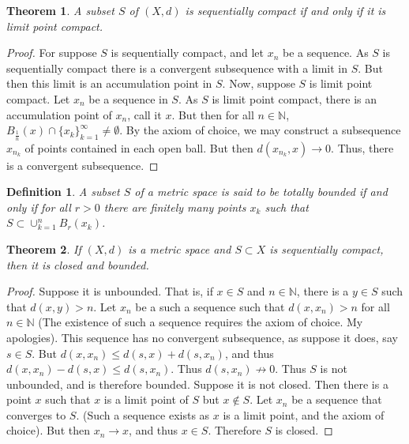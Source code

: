\documentclass[12pt,oneside]{book}
\theoremstyle{mystyle}
\newtheorem{theorem}{Theorem}[section]
\newtheorem{definition}{Definition}[section]
\begin{document}
\begin{theorem}
A subset $S$ of $(X,d)$ is sequentially compact if and only if it is limit point compact.
\end{theorem}
\begin{proof}
For suppose $S$ is sequentially compact, and let $x_n$ be a sequence. As $S$ is sequentially compact there is a convergent subsequence with a limit in $S$. But then this limit is an accumulation point in $S$. Now, suppose $S$ is limit point compact. Let $x_n$ be a sequence in $S$. As $S$ is limit point compact, there is an accumulation point of $x_n$, call it $x$. But then for all $n\in \mathbb{N}$, $B_{\frac{1}{n}}(x)\cap \{x_k\}_{k=1}^{\infty}\ne \emptyset$. By the axiom of choice, we may construct a subsequence $x_{n_k}$ of points contained in each open ball. But then $d(x_{n_k},x)\rightarrow 0$. Thus, there is a convergent subsequence.
\end{proof}

\begin{definition}
A subset $S$ of a metric space is said to be totally bounded if and only if for all $r>0$ there are finitely many points $x_k$ such that $S\subset \cup_{k=1}^{n} B_{r}(x_k)$.
\end{definition}

\begin{theorem}
If $(X,d)$ is a metric space and $S\subset X$ is sequentially compact, then it is closed and bounded.
\end{theorem}
\begin{proof}
\item Suppose it is unbounded. That is, if $x\in S$ and $n\in \mathbb{N}$, there is a $y\in S$ such that $d(x,y)>n$. Let $x_n$ be a such a sequence such that $d(x,x_n)>n$ for all $n\in \mathbb{N}$ (The existence of such a sequence requires the axiom of choice. My apologies). This sequence has no convergent subsequence, as suppose it does, say $s\in S$. But $d(x,x_n) \leq d(s,x)+d(s,x_n)$, and thus $d(x,x_n)-d(s,x)\leq d(s,x_n)$. Thus $d(s,x_n) \not\rightarrow 0$. Thus $S$ is not unbounded, and is therefore bounded. Suppose it is not closed. Then there is a point $x$ such that $x$ is a limit point of $S$ but $x\notin S$. Let $x_n$ be a sequence that converges to $S$. (Such a sequence exists as $x$ is a limit point, and the axiom of choice). But then $x_n \rightarrow x$, and thus $x\in S$. Therefore $S$ is closed.
\end{proof}
\end{document}
